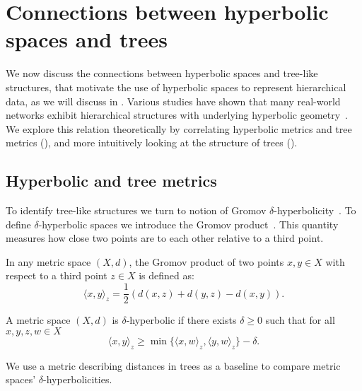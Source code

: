 \section{Connections between hyperbolic spaces and trees}\label{sec:hyperbolicAndTrees}
We now discuss the connections between hyperbolic spaces and tree-like structures, that motivate the use of hyperbolic spaces to represent hierarchical data, as we will discuss in . Various studies have shown that many real-world networks exhibit hierarchical structures with underlying hyperbolic geometry~\cite{Krioukov2010HyperbolicGeometryComplexNetworks}\cite{Papadopoulos2012popularityVSSimilarityGrowingNetworks}. We explore this relation theoretically by correlating hyperbolic metrics and tree metrics (), and more intuitively looking at the structure of trees ().

\subsection{Hyperbolic and tree metrics}\label{sec:hyperbolicTreeMetrics}
To identify tree-like structures we turn to notion of Gromov $\delta$-hyperbolicity~\cite{gromov1987hyperbolic}\cite{adcock2013tree}\cite{chen2013hyperbolicity}. To define $\delta$-hyperbolic spaces we introduce the Gromov product~\cite{gromov1987hyperbolic}. This quantity measures how close two points are to each other relative to a third point.  

\begin{definition}
    In any metric space $(X,d)$, the Gromov product of two points $x,y\in X$ with respect to a third point $z\in X$ is defined as:
    \begin{equation*}
        \langle x,y \rangle_z = \frac{1}{2}\left(d(x,z) + d(y,z) - d(x,y)\right).
    \end{equation*}
\end{definition}

\begin{definition}
    A metric space $(X,d)$ is $\delta$-hyperbolic if there exists $\delta\geq0$ such that for all $x,y,z,w\in X$
    \begin{equation*}
        \langle x,y\rangle_z \geq \min\{\langle x,w\rangle_z, \langle y, w\rangle_z\} - \delta.
    \end{equation*}
\end{definition}

We use a metric describing distances in trees as a baseline to compare metric spaces' $\delta$-hyperbolicities.

